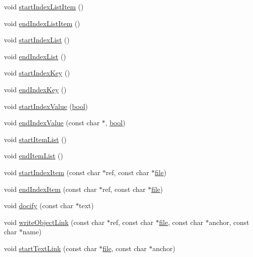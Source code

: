 \begin{DoxyCompactItemize}
\item 
void \hyperlink{class_html_generator_a528f8a53cd93274bdbb70c93be532101}{start\+Index\+List\+Item} ()
\item 
void \hyperlink{class_html_generator_a219b3a869630c6155761687cdf8a4965}{end\+Index\+List\+Item} ()
\item 
void \hyperlink{class_html_generator_a72550760e6a0c1c45a5667923b08f736}{start\+Index\+List} ()
\item 
void \hyperlink{class_html_generator_ab387bea7212012b16c44c1a3fdae04e3}{end\+Index\+List} ()
\item 
void \hyperlink{class_html_generator_a61aabe55582849829fd4197d389f5843}{start\+Index\+Key} ()
\item 
void \hyperlink{class_html_generator_a5f89e089a71b9463223efd7ad08a5d37}{end\+Index\+Key} ()
\item 
void \hyperlink{class_html_generator_a5a650d7a723ffd19f31485454ca3d2ff}{start\+Index\+Value} (\hyperlink{qglobal_8h_a1062901a7428fdd9c7f180f5e01ea056}{bool})
\item 
void \hyperlink{class_html_generator_a7693faad26cf924dd428b9ad0d7e95a0}{end\+Index\+Value} (const char $\ast$, \hyperlink{qglobal_8h_a1062901a7428fdd9c7f180f5e01ea056}{bool})
\item 
void \hyperlink{class_html_generator_aedec2c1429139e4fd713df22e5636879}{start\+Item\+List} ()
\item 
void \hyperlink{class_html_generator_aa5dc9b6c49ebf68dd54942d258716206}{end\+Item\+List} ()
\item 
void \hyperlink{class_html_generator_a02517c155d2b9fe903d33424927a95ac}{start\+Index\+Item} (const char $\ast$ref, const char $\ast$\hyperlink{class_output_generator_aed5ad11c3844cdf71ec6fee6c1c84286}{file})
\item 
void \hyperlink{class_html_generator_af6cae0eaf27fd2124f46fe009a045e51}{end\+Index\+Item} (const char $\ast$ref, const char $\ast$\hyperlink{class_output_generator_aed5ad11c3844cdf71ec6fee6c1c84286}{file})
\item 
void \hyperlink{class_html_generator_a1f33982a4ce6eac13224197e91f057d8}{docify} (const char $\ast$text)
\item 
void \hyperlink{class_html_generator_a26b15cf05292634e086ec26cede20f2e}{write\+Object\+Link} (const char $\ast$ref, const char $\ast$\hyperlink{class_output_generator_aed5ad11c3844cdf71ec6fee6c1c84286}{file}, const char $\ast$anchor, const char $\ast$name)
\item 
void \hyperlink{class_html_generator_a61a18a9d5cfa300f91af10bd72f4f51b}{start\+Text\+Link} (const char $\ast$\hyperlink{class_output_generator_aed5ad11c3844cdf71ec6fee6c1c84286}{file}, const char $\ast$anchor)

\end{DoxyCompactItemize}
